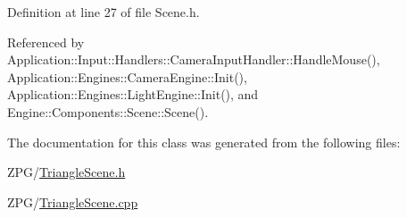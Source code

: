 Definition at line 27 of file Scene.\+h.



Referenced by Application\+::\+Input\+::\+Handlers\+::\+Camera\+Input\+Handler\+::\+Handle\+Mouse(), Application\+::\+Engines\+::\+Camera\+Engine\+::\+Init(), Application\+::\+Engines\+::\+Light\+Engine\+::\+Init(), and Engine\+::\+Components\+::\+Scene\+::\+Scene().



The documentation for this class was generated from the following files\+:\begin{DoxyCompactItemize}
\item 
Z\+P\+G/\mbox{\hyperlink{TriangleScene_8h}{Triangle\+Scene.\+h}}\item 
Z\+P\+G/\mbox{\hyperlink{TriangleScene_8cpp}{Triangle\+Scene.\+cpp}}\end{DoxyCompactItemize}
